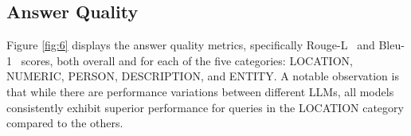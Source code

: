 \documentclass[conference]{IEEEtran}
\begin{document}
\subsection{Answer Quality}
Figure \ref{fig:6} displays the answer quality metrics, specifically Rouge-L~\cite{lin2004rouge,joshi2023deepsumm} and Bleu-1~\cite{dey2022evaluating} scores, both overall and for each of the five categories: LOCATION, NUMERIC, PERSON, DESCRIPTION, and ENTITY. A notable observation is that while there are performance variations between different LLMs, all models consistently exhibit superior performance for queries in the LOCATION category compared to the others.

\begin{figure}
\centering
     \\
     \\

\end{figure}
\end{document}
